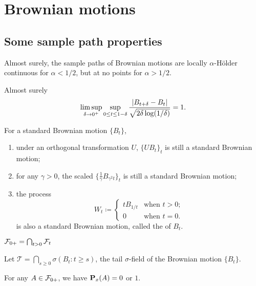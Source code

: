 \chapter{Brownian motions}


\section{Some sample path properties}

\begin{thm}
    Almost surely, the sample paths of Brownian motions are locally $\alpha$-Hölder continuous for $\alpha < 1/2$, but at no points for $\alpha > 1/2$. 
\end{thm}


\begin{namedthm}
    Almost surely \[
        \limsup_{\delta \to 0^+} \sup_{0\leq t \leq 1-\delta } \frac{\lvert B_{t+\delta}- B_t \rvert}{\sqrt{2\delta \log(1/\delta)}} = 1.
    \]
\end{namedthm}

\begin{thm}
    For a standard Brownian motion $\{B_t\}$, 
    \begin{enumerate}
        \item under an orthogonal transformation $U$, $\{UB_t\}_t$ is still a standard Brownian motion;
        \item for any $\gamma >0$, the scaled $\{\frac{1}{\gamma}B_{\gamma^2 t}\}_t$ is still a standard Brownian motion;
        \item the process \[
        W_t \coloneqq \begin{cases}
            tB_{1/t} & \text{when }t>0;\\
            0 & \text{when }t = 0.
        \end{cases}
    \] is also a standard Brownian motion, called the  of $B_t$.
    \end{enumerate}
\end{thm}

$\mathcal{F}_{0+} = \bigcap_{t > 0} \mathcal{F}_t$

Let $\mathcal T = \bigcap_{s \geq 0} \sigma(B_t:t\geq s)$, the tail $\sigma$-field of the Brownian motion $\{B_t\}$.

\begin{namedthm}
    For any $A \in \mathcal{F}_{0+}$, we have $\mathbf{P}_x(A) = 0$ or $1$.
\end{namedthm}

